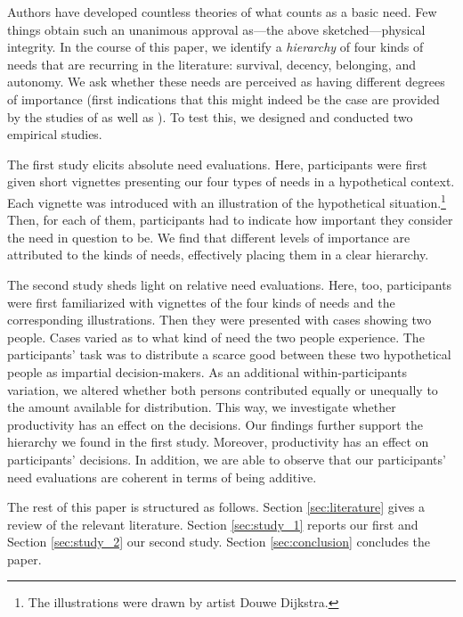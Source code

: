 \documentclass[egregdoesnotlikesansseriftitles]{scrartcl}
\begin{document}
Authors have developed countless theories of what counts as a basic need.
Few things obtain such an unanimous approval as---the above sketched---physical integrity.
In the course of this paper, we identify a \textit{hierarchy} of four kinds of needs that are recurring in the literature: survival, decency, belonging, and autonomy.
We ask whether these needs are perceived as having different degrees of importance (first indications that this might indeed be the case are provided by the studies of \citealt{poelzler_typicality_2022} as well as \citealt{bauer_needs_forthcoming}).
To test this, we designed and conducted two empirical studies.

The first study elicits absolute need evaluations.
Here, participants were first given short vignettes presenting our four types of needs in a hypothetical context.
Each vignette was introduced with an illustration of the hypothetical situation.\footnote{The illustrations were drawn by artist Douwe Dijkstra.}
Then, for each of them, participants had to indicate how important they consider the need in question to be.
We find that different levels of importance are attributed to the kinds of needs, effectively placing them in a clear hierarchy.

The second study sheds light on relative need evaluations.
Here, too, participants were first familiarized with vignettes of the four kinds of needs and the corresponding illustrations.
Then they were presented with cases showing two people.
Cases varied as to what kind of need the two people experience.
The participants' task was to distribute a scarce good between these two hypothetical people as impartial decision-makers.
As an additional within-participants variation, we altered whether both persons contributed equally or unequally to the amount available for distribution.
This way, we investigate whether productivity has an effect on the decisions.
Our findings further support the hierarchy we found in the first study.
Moreover, productivity has an effect on participants' decisions.
In addition, we are able to observe that our participants' need evaluations are coherent in terms of being additive.

The rest of this paper is structured as follows.
Section \ref{sec:literature} gives a review of the relevant literature.
Section \ref{sec:study_1} reports our first and Section \ref{sec:study_2} our second study.
Section \ref{sec:conclusion} concludes the paper.


\end{document}
